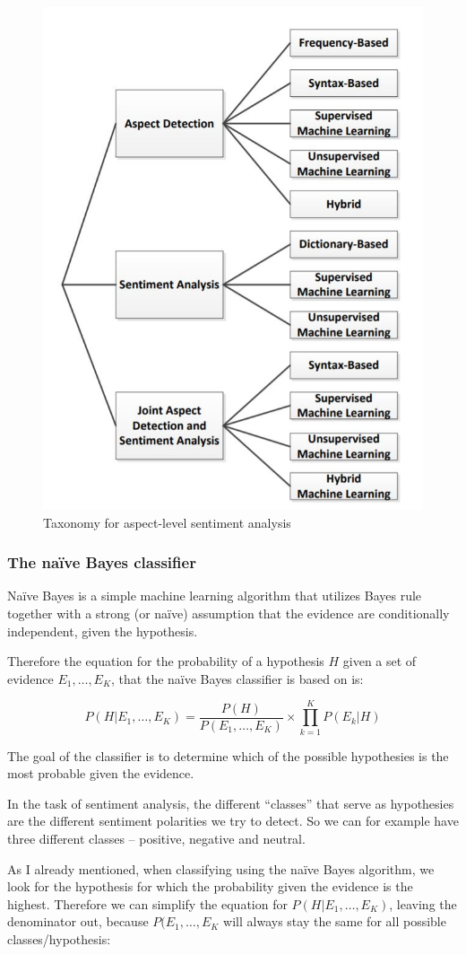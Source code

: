    \begin{figure}[htbp!]\centering
\includegraphics[width=.66\textwidth]{img/taxonomy_om}
      \caption{Taxonomy for aspect-level sentiment analysis \cite{schouten_2016}}\label{img01:taxOM}
    \end{figure}
\subsubsection{The na\"ive Bayes classifier}
 Naïve Bayes is a simple machine learning algorithm that utilizes  Bayes rule together with a strong (or na\"ive) assumption that the evidence are conditionally independent, given the hypothesis. \cite{NB}

Therefore the equation for the probability of a hypothesis $H$ given a set of evidence $E_{1},\ldots,E_{K}$, that the na\"ive Bayes classifier is based on is:

$$P\left(H|E_{1},\ldots,E_{K}\right)=\frac{P(H)}{P(E_{1},\ldots,E_{K})}\times\prod_{k=1}^{K}P\left(E_{k}|H\right)
$$

The goal of the classifier is to determine which of the possible hypothesies is the most probable given the evidence.

In the task of sentiment analysis, the different ``classes'' that serve as hypothesies are the different sentiment polarities we try to detect. So we can for example have three different classes -- positive, negative and neutral.

As I already mentioned, when classifying using the na\"ive Bayes algorithm, we look for the hypothesis for which the probability given the evidence is the highest. Therefore we can simplify the equation for $P\left(H|E_{1},\ldots,E_{K}\right)$, leaving the denominator out, because $P(E_{1},\ldots,E_{K}$ will always stay the same for all possible classes/hypothesis:

